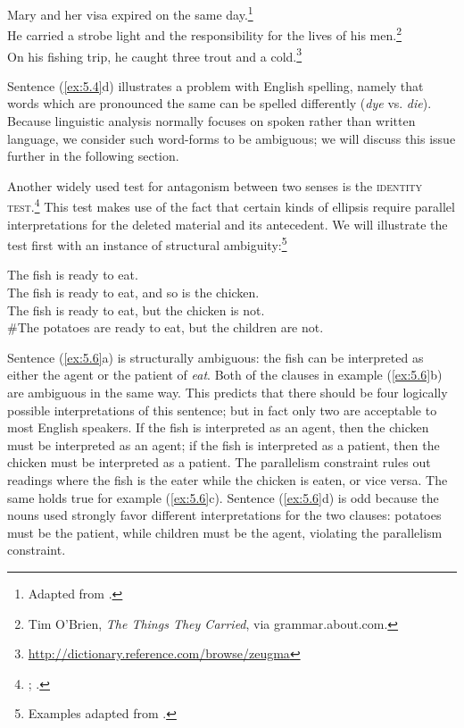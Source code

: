 \ea \label{ex:5.5}
\ea Mary and her visa expired on the same day.\footnote{Adapted from \citet[61]{Cruse1986}.}\\
\ex He carried a strobe light and the responsibility for the lives of his men.\footnote{Tim O’Brien, \textit{The Things They Carried}, via grammar.about.com.}\\
\ex On his fishing trip, he caught three trout and a cold.\footnote{\url{http://dictionary.reference.com/browse/zeugma}}
                       \z
\z


Sentence (\ref{ex:5.4}d) illustrates a problem with English spelling, namely that words which are pronounced the same can be spelled differently (\textit{dye} vs. \textit{die}). Because linguistic analysis normally focuses on spoken rather than written language, we consider such word-forms to be ambiguous; we will discuss this issue further in the following section.



Another widely used test for antagonism between two senses is the \textsc{identity test}.\footnote{\citet{Lakoff1970}; \citet{ZwickySadock1975}.} This test makes use of the fact that certain kinds of ellipsis require parallel interpretations for the deleted material and its antecedent. We will illustrate the test first with an instance of structural ambiguity:\footnote{Examples adapted from \citet[512]{Kennedy2011}.}


\ea \label{ex:5.6}
\ea The fish is ready to eat.\\
\ex The fish is ready to eat, and so is the chicken.\\
\ex The fish is ready to eat, but the chicken is not.\\
\ex \#The potatoes are ready to eat, but the children are not.
                       \z
\z


Sentence (\ref{ex:5.6}a) is structurally ambiguous: the fish can be interpreted as either the agent or the patient of \textit{eat}. Both of the clauses in example (\ref{ex:5.6}b) are ambiguous in the same way. This predicts that there should be four logically possible interpretations of this sentence; but in fact only two are acceptable to most English speakers. If the fish is interpreted as an agent, then the chicken must be interpreted as an agent; if the fish is interpreted as a patient, then the chicken must be interpreted as a patient. The parallelism constraint rules out readings where the fish is the eater while the chicken is eaten, or vice versa. The same holds true for example (\ref{ex:5.6}c). Sentence (\ref{ex:5.6}d) is odd because the nouns used strongly favor different interpretations for the two clauses: potatoes must be the patient, while children must be the agent, violating the parallelism constraint.



